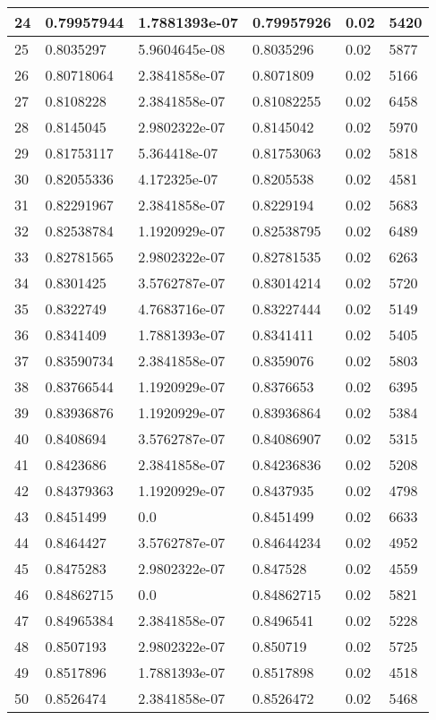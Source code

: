 \begin{longtable}{|l|l|l|l|l|l|}
24 & 0.79957944 & 1.7881393e-07 & 0.79957926 & 0.02 & 5420 \\ \hline 
25 & 0.8035297 & 5.9604645e-08 & 0.8035296 & 0.02 & 5877 \\ \hline 
26 & 0.80718064 & 2.3841858e-07 & 0.8071809 & 0.02 & 5166 \\ \hline 
27 & 0.8108228 & 2.3841858e-07 & 0.81082255 & 0.02 & 6458 \\ \hline 
28 & 0.8145045 & 2.9802322e-07 & 0.8145042 & 0.02 & 5970 \\ \hline 
29 & 0.81753117 & 5.364418e-07 & 0.81753063 & 0.02 & 5818 \\ \hline 
30 & 0.82055336 & 4.172325e-07 & 0.8205538 & 0.02 & 4581 \\ \hline 
31 & 0.82291967 & 2.3841858e-07 & 0.8229194 & 0.02 & 5683 \\ \hline 
32 & 0.82538784 & 1.1920929e-07 & 0.82538795 & 0.02 & 6489 \\ \hline 
33 & 0.82781565 & 2.9802322e-07 & 0.82781535 & 0.02 & 6263 \\ \hline 
34 & 0.8301425 & 3.5762787e-07 & 0.83014214 & 0.02 & 5720 \\ \hline 
35 & 0.8322749 & 4.7683716e-07 & 0.83227444 & 0.02 & 5149 \\ \hline 
36 & 0.8341409 & 1.7881393e-07 & 0.8341411 & 0.02 & 5405 \\ \hline 
37 & 0.83590734 & 2.3841858e-07 & 0.8359076 & 0.02 & 5803 \\ \hline 
38 & 0.83766544 & 1.1920929e-07 & 0.8376653 & 0.02 & 6395 \\ \hline 
39 & 0.83936876 & 1.1920929e-07 & 0.83936864 & 0.02 & 5384 \\ \hline 
40 & 0.8408694 & 3.5762787e-07 & 0.84086907 & 0.02 & 5315 \\ \hline 
41 & 0.8423686 & 2.3841858e-07 & 0.84236836 & 0.02 & 5208 \\ \hline 
42 & 0.84379363 & 1.1920929e-07 & 0.8437935 & 0.02 & 4798 \\ \hline 
43 & 0.8451499 & 0.0 & 0.8451499 & 0.02 & 6633 \\ \hline 
44 & 0.8464427 & 3.5762787e-07 & 0.84644234 & 0.02 & 4952 \\ \hline 
45 & 0.8475283 & 2.9802322e-07 & 0.847528 & 0.02 & 4559 \\ \hline 
46 & 0.84862715 & 0.0 & 0.84862715 & 0.02 & 5821 \\ \hline 
47 & 0.84965384 & 2.3841858e-07 & 0.8496541 & 0.02 & 5228 \\ \hline 
48 & 0.8507193 & 2.9802322e-07 & 0.850719 & 0.02 & 5725 \\ \hline 
49 & 0.8517896 & 1.7881393e-07 & 0.8517898 & 0.02 & 4518 \\ \hline 
50 & 0.8526474 & 2.3841858e-07 & 0.8526472 & 0.02 & 5468 \\ \hline 
\end{longtable}